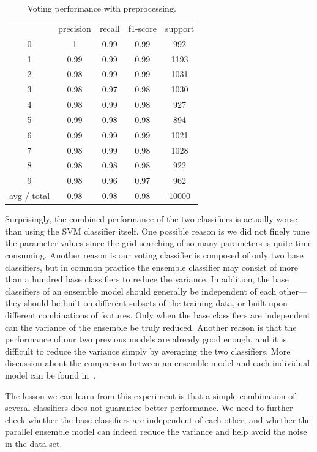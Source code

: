 \documentclass{article}
\begin{document}
\begin{table}[!htb]
	\centering
	\small 
	\caption{Voting performance with preprocessing.}
	\begin{tabular}{ccccc}
		& precision & recall & f1-score & support \\
		0     & 1     & 0.99  & 0.99  & 992 \\
		1     & 0.99  & 0.99  & 0.99  & 1193 \\
		2     & 0.98  & 0.99  & 0.99  & 1031 \\
		3     & 0.98  & 0.97  & 0.98  & 1030 \\
		4     & 0.98  & 0.99  & 0.98  & 927 \\
		5     & 0.99  & 0.98  & 0.98  & 894 \\
		6     & 0.99  & 0.99  & 0.99  & 1021 \\
		7     & 0.98  & 0.99  & 0.98  & 1028 \\
		8     & 0.98  & 0.98  & 0.98  & 922 \\
		9     & 0.98  & 0.96  & 0.97  & 962 \\
		avg / total & 0.98  & 0.98  & 0.98  & 10000 \\
	\end{tabular}%
	\label{tbl:voting}%
\end{table}%


Surprisingly, the combined performance of the two classifiers is actually worse than using the SVM classifier itself. One possible reason is we did not finely tune the parameter values since the grid searching of so many parameters is quite time consuming. Another reason is our voting classifier is composed of only two base classifiers, but in common practice the ensemble classifier may consist of more than a hundred base classifiers to reduce the variance. In addition, the base classifiers of an ensemble model should generally be independent of each other---they should be built on different subsets of the training data, or built upon different combinations of features. Only when the base classifiers are independent can the variance of the ensemble be truly reduced. Another reason is that the performance of our two previous models are already good enough, and it is difficult to reduce the variance simply by averaging the two classifiers. More discussion about the comparison between an ensemble model and each individual model can be found in~\cite{dvzeroski2004combining}. 

The lesson we can learn from this experiment is that a simple combination of several classifiers does not guarantee better performance. We need to further check whether the base classifiers are independent of each other, and whether the parallel ensemble model can indeed reduce the variance and help avoid the noise in the data set.
\end{document}

